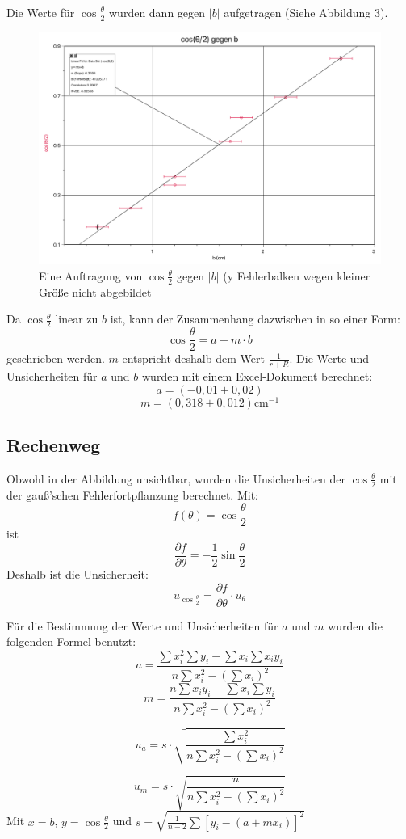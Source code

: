 \documentclass[11pt,a4paper]{article}
\begin{document}
Die Werte für $\cos{\frac{\theta}{2}}$ wurden dann gegen $\left|b\right|$ aufgetragen (Siehe Abbildung 3). 
\begin{figure}[h]
	\centering
	\includegraphics[width=\linewidth]{Abb2}
	\caption{Eine Auftragung von $\cos{\frac{\theta}{2}}$ gegen $|b|$ (y Fehlerbalken wegen kleiner Größe nicht abgebildet}
\end{figure}

Da $\cos{\frac{\theta}{2}}$ linear zu $b$ ist, kann der Zusammenhang dazwischen in so einer Form:
$$ \cos{\frac{\theta}{2}} = a+m\cdot b$$
geschrieben werden. $m$ entspricht deshalb dem Wert $\frac{1}{r+R}$. Die Werte und Unsicherheiten für $a$ und $b$ wurden mit einem Excel-Dokument berechnet:
$$ a = (-0,01 \pm 0,02) $$
$$ m = (0,318 \pm 0,012) \textrm{cm}^{-1} $$

\begin{tcolorbox}[colback=white]
\subsection{Rechenweg}
Obwohl in der Abbildung unsichtbar, wurden die Unsicherheiten der $\cos{\frac{\theta}{2}}$ mit der gauß'schen Fehlerfortpflanzung berechnet. 
Mit:
$$f(\theta) = \cos\frac{\theta}{2}$$
ist
$$\frac{\partial f}{\partial \theta} = -\frac{1}{2}\sin\frac{\theta}{2}$$
Deshalb ist die Unsicherheit:
$$u_{\cos\frac{\theta}{2}} = \frac{\partial f}{\partial \theta}\cdot u_\theta$$

Für die Bestimmung der Werte und Unsicherheiten für $a$ und $m$ wurden die folgenden Formel benutzt:
$$a = \frac{
	\sum x_i^2 \sum y_i - \sum x_i \sum x_iy_i
}{
	n \sum x_i^2 - (\sum x_i)^2
}$$
$$ m = \frac{
	n\sum x_iy_i-\sum x_i \sum y_i
}{
	n \sum x_i^2 - (\sum x_i)^2
}$$
\end{tcolorbox}
\begin{tcolorbox}[colback=white]
$$u_a = s\cdot \sqrt{
	\frac{
		\sum x_i^2
	}{
		n\sum x_i^2 - (\sum x_i)^2
}}$$

$$u_m = s\cdot \sqrt{
	\frac{
		n
	}{
		n\sum x_i^2 - (\sum x_i)^2
}}$$
Mit $x = b$, $y = \cos\frac{\theta}{2}$ und $s = \sqrt{
	\frac{1}{n-2}\sum [y_i-(a+mx_i)]^2}$
	
\end{tcolorbox}
\end{document}
